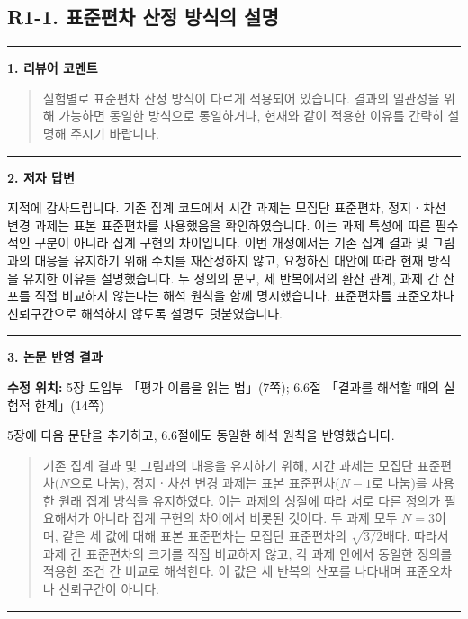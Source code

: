 \documentclass[11pt]{article}
\newcommand{\fieldheading}[2]{%
  \par\medskip\noindent
  {\color{#1}\rule{3pt}{1.25em}}\hspace{0.55em}\textbf{#2}\par\smallskip}
\newenvironment{reviewitem}[1]
  {\subsection*{#1}}
  {\par\medskip\hrule\bigskip}
\newenvironment{reviewercomment}
  {\fieldheading{reviewercolor}{1. 리뷰어 코멘트}%
   \begin{quote}}
  {\end{quote}}
\newenvironment{authorresponse}
  {\fieldheading{responsecolor}{2. 저자 답변}}
  {\par}
\newenvironment{manuscriptrevision}[1]
  {\fieldheading{revisioncolor}{3. 논문 반영 결과}%
   \textbf{수정 위치:} #1\par\smallskip}
  {\par}
\begin{document}
\clearpage
\begin{reviewitem}{R1-1. 표준편차 산정 방식의 설명}
\begin{reviewercomment}
실험별로 표준편차 산정 방식이 다르게 적용되어 있습니다. 결과의 일관성을 위해 가능하면 동일한 방식으로 통일하거나, 현재와 같이 적용한 이유를 간략히 설명해 주시기 바랍니다.
\end{reviewercomment}
\begin{authorresponse}
지적에 감사드립니다. 기존 집계 코드에서 시간 과제는 모집단 표준편차,
정지ㆍ차선 변경 과제는 표본 표준편차를 사용했음을 확인하였습니다.
이는 과제 특성에 따른 필수적인 구분이 아니라 집계 구현의 차이입니다.
이번 개정에서는 기존 집계 결과 및 그림과의 대응을 유지하기 위해 수치를
재산정하지 않고, 요청하신 대안에 따라 현재 방식을 유지한 이유를 설명했습니다.
두 정의의 분모, 세 반복에서의 환산 관계, 과제 간 산포를 직접 비교하지 않는다는
해석 원칙을 함께 명시했습니다. 표준편차를 표준오차나 신뢰구간으로 해석하지
않도록 설명도 덧붙였습니다.
\end{authorresponse}
\begin{manuscriptrevision}{5장 도입부 「평가 이름을 읽는 법」(7쪽); 6.6절 「결과를 해석할 때의 실험적 한계」(14쪽)}
5장에 다음 문단을 추가하고, 6.6절에도 동일한 해석 원칙을 반영했습니다.
\begin{quote}
기존 집계 결과 및 그림과의 대응을 유지하기 위해, 시간 과제는 모집단 표준편차($N$으로 나눔), 정지ㆍ차선 변경 과제는 표본 표준편차($N-1$로 나눔)를 사용한 원래 집계 방식을 유지하였다. 이는 과제의 성질에 따라 서로 다른 정의가 필요해서가 아니라 집계 구현의 차이에서 비롯된 것이다. 두 과제 모두 $N=3$이며, 같은 세 값에 대해 표본 표준편차는 모집단 표준편차의 $\sqrt{3/2}$배다. 따라서 과제 간 표준편차의 크기를 직접 비교하지 않고, 각 과제 안에서 동일한 정의를 적용한 조건 간 비교로 해석한다. 이 값은 세 반복의 산포를 나타내며 표준오차나 신뢰구간이 아니다.
\end{quote}
\end{manuscriptrevision}
\end{reviewitem}
\end{document}
